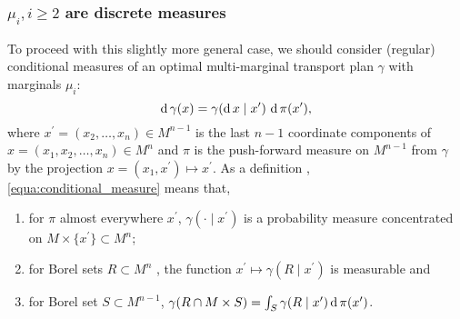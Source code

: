 \subsubsection{$\mu_i, i \geq 2$ are discrete measures}
To proceed with this slightly more general case,
we should consider (regular) conditional measures \cite[Section 10.4]{Bogachev2007} of an optimal multi-marginal transport plan $\gamma$
with marginals $\mu_i$:
\begin{equation}
	\label{equa:conditional_measure}
	\operatorname{d} \gamma(x) = \gamma(\operatorname{d} x \mid x^\prime)\, \operatorname{d} \pi(x^\prime) ,
\end{equation}
where $x^\prime = (x_2, \ldots, x_n) \in M^{n-1}$ is the last $n-1$ coordinate components
of $x = (x_1, x_2, \ldots, x_n) \in M^n$ and
$\pi$ is the push-forward measure on $M^{n-1}$ from $\gamma$ by
the projection $x = (x_1, x^\prime) \mapsto x^\prime$.
As a definition \cite[Definition 10.4.1]{Bogachev2007}, \cref{equa:conditional_measure} means that,
\begin{enumerate}
	\item for $\pi$ almost everywhere $x^\prime$, $\gamma(\cdot \mid x^\prime)$ is a probability measure
	      concentrated on $M \times \{x^\prime\} \subset M^n$;
	\item for Borel sets $R \subset M^n$ , the function $ x^\prime \mapsto \gamma(R \mid x^\prime)$ is measurable and
	\item for Borel set $S \subset M^{n-1}$,
	      $\gamma(R \cap M \times S) = \int_{S} \gamma( R \mid x^\prime) \operatorname{d} \pi(x^\prime)$.
\end{enumerate}

